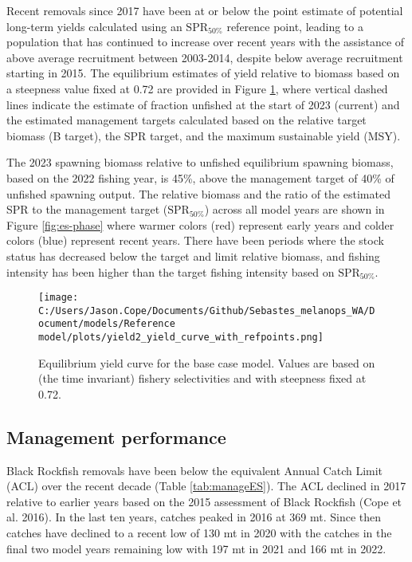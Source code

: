 \documentclass[11pt,
  letterpaper,
]{article}
\begin{document}
Recent removals since 2017 have been at or below the point estimate of potential long-term yields calculated using an \(\text{SPR}_{50\%}\) reference point, leading to a population that has continued to increase over recent years with the assistance of above average recruitment between 2003-2014, despite below average recruitment starting in 2015. The equilibrium estimates of yield relative to biomass based on a steepness value fixed at 0.72 are provided in Figure \ref{fig:es-yield}, where vertical dashed lines indicate the estimate of fraction unfished at the start of 2023 (current) and the estimated management targets calculated based on the relative target biomass (B target), the SPR target, and the maximum sustainable yield (MSY).

The 2023 spawning biomass relative to unfished equilibrium spawning biomass, based on the 2022 fishing year, is 45\%, above the management target of 40\% of unfished spawning output. The relative biomass and the ratio of the estimated SPR to the management target (\(\text{SPR}_{50\%}\)) across all model years are shown in Figure \ref{fig:es-phase} where warmer colors (red) represent early years and colder colors (blue) represent recent years. There have been periods where the stock status has decreased below the target and limit relative biomass, and fishing intensity has been higher than the target fishing intensity based on \(\text{SPR}_{50\%}\).

\begin{figure}
{\centering
\texttt{[image: C:/Users/Jason.Cope/Documents/Github/Sebastes\_melanops\_WA/Document/models/Reference model/plots/yield2\_yield\_curve\_with\_refpoints.png]}
}
\caption{Equilibrium yield curve for the base case model. Values are based on (the time invariant)
fishery selectivities and with steepness fixed at 0.72.\label{fig:es-yield}}
\end{figure}

\clearpage



\clearpage

\hypertarget{management-performance}{%
\subsection*{Management performance}\label{management-performance}}

Black Rockfish removals have been below the equivalent Annual Catch Limit (ACL) over the recent decade (Table \ref{tab:manageES}). The ACL declined in 2017 relative to earlier years based on the 2015 assessment of Black Rockfish (Cope et al. 2016). In the last ten years, catches peaked in 2016 at 369 mt. Since then catches have declined to a recent low of 130 mt in 2020 with the catches in the final two model years remaining low with 197 mt in 2021 and 166 mt in 2022.
\end{document}
